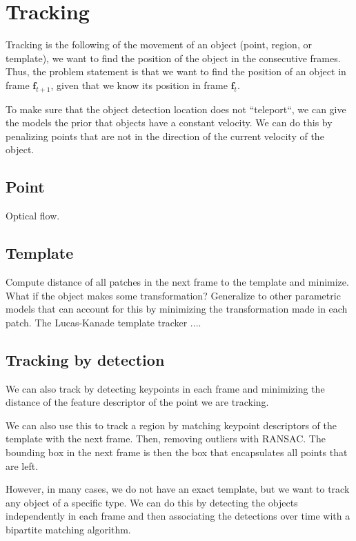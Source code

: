 \section{Tracking} \label{sec:tracking}

Tracking is the following of the movement of an object (point, region, or
template), \ie we want to find the position of the object in the consecutive
frames. Thus, the problem statement is that we want to find the position of
an object in frame $\bm{f}_{t+1}$, given that we know its position in frame
$\bm{f}_t$.

To make sure that the object detection location does not ``teleport``, we can
give the models the prior that objects have a constant
velocity.
We can do this by penalizing points that are not in the direction of the
current velocity of the object.

\subsection{Point}

Optical flow.

\subsection{Template}

Compute distance of all patches in the next frame to the template and
minimize. What if the object makes some transformation? Generalize to other
parametric models that can account for this by minimizing the transformation
made in each patch. The Lucas-Kanade template tracker ....

\subsection{Tracking by detection}

We can also track by detecting keypoints in each frame and minimizing the
distance of the feature descriptor of the point we are tracking.

We can also use this to track a region by matching keypoint descriptors of
the template with the next frame. Then, removing outliers with \eg RANSAC.
The bounding box in the next frame is then the box that encapsulates all
points that are left.

However, in many cases, we do not have an exact template, but we want to
track any object of a specific type. We can do this by detecting the objects
independently in each frame and then associating the detections over time
with a bipartite matching algorithm.

